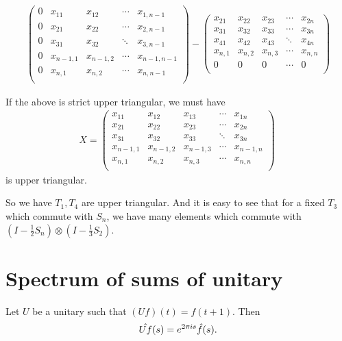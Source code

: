 \documentclass[a4paper,10pt]{amsart}
\begin{document}
\begin{align*}
\begin{pmatrix}
       0 & x_{11} & x_{12} & \cdots & x_{1,n-1} \\
       0 & x_{21} & x_{22} & \cdots & x_{2,n-1}\\
       0 & x_{31} & x_{32} & \ddots & x_{3,n-1} \\
       0 &  x_{n-1,1} &  x_{n-1,2} & \cdots & x_{n-1,n-1}  \\
       0  & x_{n,1}  & x_{n,2}  & \cdots & x_{n,n-1}   \\
    \end{pmatrix} -  
    \begin{pmatrix} 
       x_{21} & x_{22} & x_{23} & \cdots & x_{2n} \\
       x_{31} & x_{32} & x_{33} & \cdots & x_{3n}\\
       x_{41} & x_{42} & x_{43} & \ddots & x_{4n} \\
       x_{n,1} &  x_{n,2} &  x_{n,3} & \cdots & x_{n,n}  \\
       0  & 0  & 0  & \cdots & 0   \\
    \end{pmatrix}
\end{align*}

If the above is strict upper triangular, we must have 
\begin{align*}
    X= \begin{pmatrix} 
       x_{11} & x_{12} & x_{13} & \cdots & x_{1n} \\
       x_{21} & x_{22} & x_{23} & \cdots & x_{2n}\\
       x_{31} & x_{32} & x_{33} & \ddots & x_{3n} \\
       x_{n-1,1} &  x_{n-1,2} &  x_{n-1,3} & \cdots & x_{n-1,n}  \\
       x_{n,1}  & x_{n,2}  & x_{n,3}  & \cdots & x_{n,n}   \\
    \end{pmatrix}\
\end{align*}
is upper triangular.

So we have $T_1, T_4$ are upper triangular.
And it is easy to see that for a fixed $T_3$ which commute with $S_n$, we have many
elements which commute with $(I-\frac{1}{2}S_n) \otimes (I- \frac{1}{3}S_2)$.
 
\section{Spectrum of sums of unitary}

Let $U$ be a unitary such that $(Uf)(t) = f(t+1)$. Then
\begin{align*}
    \Hat{Uf}(s) = e^{2\pi i s}\Hat{f}(s). 
\end{align*}
\end{document}
